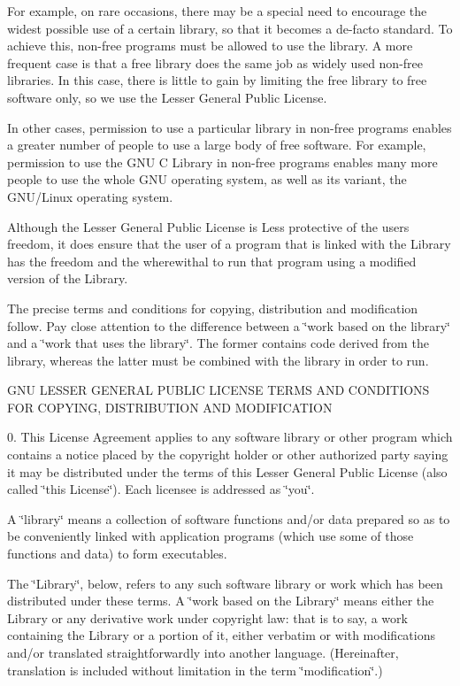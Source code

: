 For example, on rare occasions, there may be a special need to encourage the widest possible use of a certain library, so that it becomes a de-\/facto standard. To achieve this, non-\/free programs must be allowed to use the library. A more frequent case is that a free library does the same job as widely used non-\/free libraries. In this case, there is little to gain by limiting the free library to free software only, so we use the Lesser General Public License.

In other cases, permission to use a particular library in non-\/free programs enables a greater number of people to use a large body of free software. For example, permission to use the G\+N\+U C Library in non-\/free programs enables many more people to use the whole G\+N\+U operating system, as well as its variant, the G\+N\+U/\+Linux operating system.

Although the Lesser General Public License is Less protective of the users\textquotesingle{} freedom, it does ensure that the user of a program that is linked with the Library has the freedom and the wherewithal to run that program using a modified version of the Library.

The precise terms and conditions for copying, distribution and modification follow. Pay close attention to the difference between a \char`\"{}work based on the library\char`\"{} and a \char`\"{}work that uses the library\char`\"{}. The former contains code derived from the library, whereas the latter must be combined with the library in order to run.

G\+N\+U L\+E\+S\+S\+E\+R G\+E\+N\+E\+R\+A\+L P\+U\+B\+L\+I\+C L\+I\+C\+E\+N\+S\+E T\+E\+R\+M\+S A\+N\+D C\+O\+N\+D\+I\+T\+I\+O\+N\+S F\+O\+R C\+O\+P\+Y\+I\+N\+G, D\+I\+S\+T\+R\+I\+B\+U\+T\+I\+O\+N A\+N\+D M\+O\+D\+I\+F\+I\+C\+A\+T\+I\+O\+N

0. This License Agreement applies to any software library or other program which contains a notice placed by the copyright holder or other authorized party saying it may be distributed under the terms of this Lesser General Public License (also called \char`\"{}this License\char`\"{}). Each licensee is addressed as \char`\"{}you\char`\"{}.

A \char`\"{}library\char`\"{} means a collection of software functions and/or data prepared so as to be conveniently linked with application programs (which use some of those functions and data) to form executables.

The \char`\"{}\+Library\char`\"{}, below, refers to any such software library or work which has been distributed under these terms. A \char`\"{}work based on the
\+Library\char`\"{} means either the Library or any derivative work under copyright law\+: that is to say, a work containing the Library or a portion of it, either verbatim or with modifications and/or translated straightforwardly into another language. (Hereinafter, translation is included without limitation in the term \char`\"{}modification\char`\"{}.)

